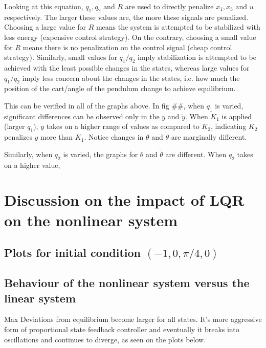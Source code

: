 \documentclass[10pt]{article}
\begin{document}
Looking at this equation, $q_1, q_2 \text{ and } R$ are used to directly penalize $x_1, x_3 \text{ and } u$ respectively. The larger these values are, the more these signals are penalized. Choosing a large value for $R$ means the system is attempted to be stabilized with less energy (expensive control strategy). On the contrary, choosing a small value for $R$ means there is no penalization on the control signal (cheap control strategy). Similarly, small values for $q_1/q_2$ imply stabilization is attempted to be achieved with the least possible changes in the states, whereas large values for $q_1/q_2$ imply less concern about the changes in the states, i.e. how much the position of the cart/angle of the pendulum change to achieve equilibrium.

This can be verified in all of the graphs above. In fig ##, when $q_1$ is varied, significant differences can be observed only in the $y$ and $\dot{y}$. When $K_1$ is applied (larger $q_1$), $y$ takes on a higher range of values as compared to $K_2$, indicating $K_2$ penalizes $y$ more than $K_1$. Notice changes in $\theta$ and $\dot{\theta}$ are marginally different.

Similarly, when $q_2$ is varied, the graphs for $\theta$ and $\dot{\theta}$ are different. When $q_2$ takes on a higher value, 

\section{Discussion on the impact of LQR on the nonlinear system}

\subsection{Plots for initial condition \texorpdfstring{$(-1, 0, \pi/4, 0)$}{(−1, 0, π/4, 0)}}

\subsection{Behaviour of the nonlinear system versus the linear system}
Max Deviations from equilibrium become larger for all states. It's more aggressive form of proportional state feedback controller and eventually it breaks into oscillations and continues to diverge, as seen on the plots below.
\end{document}
